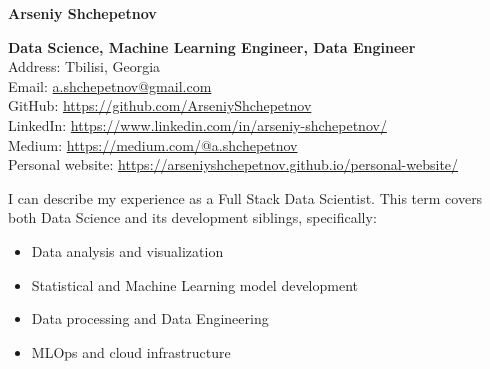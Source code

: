 \documentclass[10pt,a4paper]{article}
\newcommand{\vSpace}{0.5cm}
\newcommand{\vacancyName}{PhD student}
\begin{document}
	

	\raggedright{\Large{\textbf{Arseniy Shchepetnov}}}\\[0.3cm]
	
	\begin{minipage}[t]{0.8\textwidth}
		\vspace{0pt}
		\raggedright{\textbf{Data Science, Machine Learning Engineer, Data Engineer}}\\[0.3cm]
		\noindent Address: Tbilisi, Georgia \\[0.1cm]
		\noindent Email: \href{mailto:a.shchepetnov@gmail.com}{a.shchepetnov@gmail.com}\\[0.1cm]
		\noindent GitHub: \href{https://github.com/ArseniyShchepetnov}{https://github.com/ArseniyShchepetnov}\\
            \noindent LinkedIn: \href{https://www.linkedin.com/in/arseniy-shchepetnov/}{https://www.linkedin.com/in/arseniy-shchepetnov/}\\
            \noindent Medium: \href{https://medium.com/@a.shchepetnov}{https://medium.com/@a.shchepetnov} \\
            \noindent Personal website: \href{https://arseniyshchepetnov.github.io/personal-website/}{https://arseniyshchepetnov.github.io/personal-website/}
	\end{minipage}

 
\vspace{\vSpace}

\begin{minipage}[t]{1\textwidth}
\vspace{0pt}
\quad I can describe my experience as a Full Stack Data Scientist. This term covers both Data Science and its development siblings, specifically:
\begin{itemize}
    \item Data analysis and visualization
    \item Statistical and Machine Learning model development
    \item Data processing and Data Engineering
    \item MLOps and cloud infrastructure
\end{itemize}

\quad 
\end{minipage}
	
\end{document}
